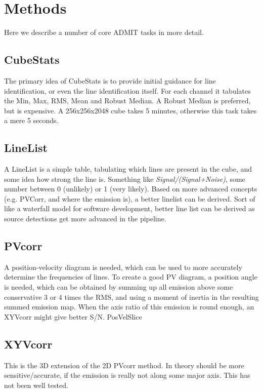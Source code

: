 \documentclass{article}
\begin{document}
\section{Methods}

Here we describe a number of core ADMIT tasks in more detail.

\subsection{CubeStats}

The primary idea of CubeStats is to provide initial guidance for line
identification, or even the line identification itself. For each
channel it tabulates the Min, Max, RMS, Mean and Robust Median.
A Robust Median is preferred, but is expensive. A 256x256x2048
cube takes 5 minutes, otherwise this task takes a mere 5 seconds.

\subsection{LineList}

A LineList is a simple table, tabulating which lines are present
in the cube, and some idea how strong the line is. Something like
{\it Signal/(Signal+Noise)}, some number between 0 (unlikely) or 1 
(very likely). Based on more advanced concepts (e.g. PVCorr, 
and where the emission is), a better linelist can be derived. Sort
of like a waterfall model for software development, better
line list can be derived as source detections get more advanced
in the pipeline.

\subsection{PVcorr}

A position-velocity diagram is needed, which can be used to more
accurately determine the frequencies of lines.  To create a good
PV diagram, a position angle is needed, which can be obtained
by summing up all emission above some conservative 3 or 4 times
the RMS, and using a moment of inertia in the resulting summed
emission map.  When the axis ratio of this emission is round
enough, an XYVcorr might give better S/N.  PosVelSlice

\subsection{XYVcorr}

This is the 3D extension of the 2D PVcorr method. In theory should be
more sensitive/accurate, if the emission is really not along some
major axis. This has not been well tested.
\end{document}
